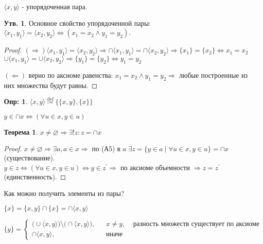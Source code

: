 \documentclass[12pt]{article}
\theoremstyle{definition}
\newtheorem{defn}{Опр:}
\newtheorem{prop}{Утв.}
\newtheorem{theorem}{Теорема}
\begin{document}
$\langle x,y\rangle$ - упорядоченная пара.
\begin{prop}
	Основное свойство упорядоченной пары: $\langle x_1,y_1\rangle = \langle x_2, y_2 \rangle \Leftrightarrow (x_1 = x_2 \wedge y_1 = y_2)$.	
\end{prop}

\begin{proof}
$(\Rightarrow) \langle x_1, y_1 \rangle =  \langle x_2, y_2 \rangle \Rightarrow \cap \langle x_1, y_1 \rangle = \cap \langle x_2, y_2 \rangle \Rightarrow \{x_1\} = \{x_2\} \Leftrightarrow x_1 = x_2$\\
$\cup \langle x_1, y_1 \rangle = \cup \langle x_2, y_2 \rangle \Rightarrow \{y_1\} = \{y_2\} \Leftrightarrow y_1 = y_2$

$(\Leftarrow)$ верно по аксиоме равенства: $x_1 = x_2 \wedge y_1 = y_2 \Rightarrow$ любые построенные из них множества будут равны.
\end{proof}

\begin{defn}
	 $\langle x,y\rangle \overset{\text{def}}{\coloneqq} \big\{\{x,y\}, \{x\} \big\}$
\end{defn}

$y \in \cap x \Leftrightarrow (\forall u \in x, y \in u)$

\begin{theorem}
	$x \neq \varnothing \Rightarrow \exists! z \colon z = \cap x$
\end{theorem}

\begin{proof}
	$x \neq \varnothing \Rightarrow \exists a, a \in x \Rightarrow$ по (А5) в $a \; \exists z = \{y\in a \mid \forall u \in x, y \in u\} = \cap x$ (существование).\\
	$y \in z \Leftrightarrow (\forall u \in x, y \in u) \Leftrightarrow y \in z^\prime \Rightarrow$ по аксиоме объемности $\Rightarrow z = z^\prime$ (единственность).
\end{proof}

Как можно получить элементы из пары?

$\{x\} = \{x,y\} \cap \{x\} = \cap \langle x, y\rangle$

$\{y\}= \left\{ \begin{aligned}
	\big(\cup \langle x,y \rangle\big) \setminus \big(\cap \langle x,y \rangle\big),&& x \neq y, & \text{ разность множеств существует по аксиоме выделения}\\
	\cap \langle x,y \rangle, && \text{иначе} &  
\end{aligned}
\right.$
\end{document}
